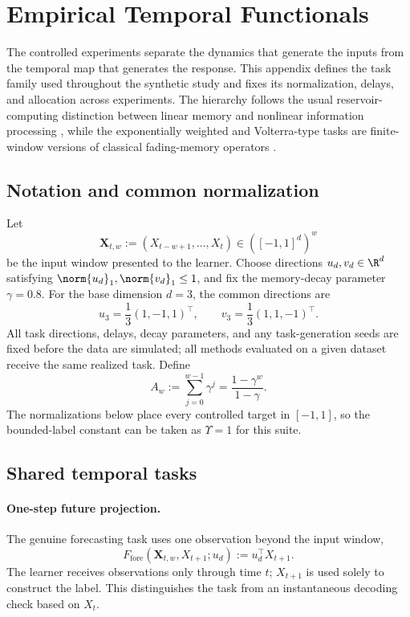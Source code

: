 \section{Empirical Temporal Functionals}
\label{app:functionals}

The controlled experiments separate the dynamics that generate the inputs from
the temporal map that generates the response.  This appendix defines the task
family used throughout the synthetic study and fixes its normalization,
delays, and allocation across experiments.  The hierarchy follows the usual
reservoir-computing distinction between linear memory and nonlinear
information processing \citep{Jaeger2001,DambreEtAl2012}, while the exponentially
weighted and Volterra-type tasks are finite-window versions of classical
fading-memory operators \citep{BoydChua1985}.

\subsection{Notation and common normalization}
\label{app:functional-notation}

Let
\[
    \bm X_{t,w}:=(X_{t-w+1},\ldots,X_t)\in([-1,1]^d)^w
\]
be the input window presented to the learner.  Choose directions
\(u_d,v_d\in\R^d\) satisfying
\(\norm{u_d}_1,\norm{v_d}_1\leq1\), and fix the memory-decay parameter
\(\gamma=0.8\).  For the base dimension \(d=3\), the common directions are
\[
    u_3=\frac13(1,-1,1)^\top,
    \qquad
    v_3=\frac13(1,1,-1)^\top.
\]
All task directions, delays, decay parameters, and any task-generation seeds
are fixed before the data are simulated; all methods evaluated on a given
dataset receive the same realized task. Define
\begin{equation}
    A_w:=\sum_{j=0}^{w-1}\gamma^j
        =\frac{1-\gamma^w}{1-\gamma}.
    \label{eq:functional-Aw}
\end{equation}
The normalizations below place every controlled target in \([-1,1]\), so the
bounded-label constant can be taken as \(\Upsilon=1\) for this suite.

\subsection{Shared temporal tasks}
\label{app:shared-functionals}

\paragraph{One-step future projection.}
The genuine forecasting task uses one observation beyond the input window,
\begin{equation}
    F_{\mathrm{fore}}(\bm X_{t,w},X_{t+1};u_d)
    :=u_d^\top X_{t+1}.
    \label{eq:functional-forecast}
\end{equation}
The learner receives observations only through time \(t\); \(X_{t+1}\) is used
solely to construct the label.  This distinguishes the task from an
instantaneous decoding check based on \(X_t\).

